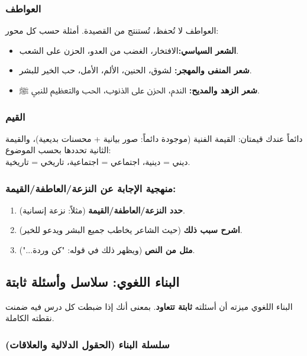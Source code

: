 \documentclass[12pt,a4paper]{book}
\begin{document}
	\subsubsection*{العواطف}
	
	العواطف لا تُحفظ، تُستنتج من القصيدة. أمثلة حسب كل محور:
		\begin{itemize}
			\item \textbf{الشعر السياسي:}الافتخار، الغضب من العدو، الحزن على الشعب.
			\item \textbf{شعر المنفى والمهجر:} لشوق، الحنين، الألم، الأمل، حب الخير للبشر.
			\item \textbf{شعر الزهد والمديح:} الندم، الحزن على الذنوب، الحب والتعظيم للنبي ﷺ. 
		\end{itemize}
	
	\subsubsection*{القيم}
	
	دائماً عندك قيمتان: القيمة الفنية (موجودة دائماً: صور بيانية + محسنات بديعية)، والقيمة الثانية تحددها بحسب الموضوع: \\ ديني = دينية، اجتماعي = اجتماعية، تاريخي = تاريخية.
	
	\subsubsection*{منهجية الإجابة عن النزعة/العاطفة/القيمة:}
	\begin{enumerate}
		\item \textbf{حدد النزعة/العاطفة/القيمة} (مثلاً: نزعة إنسانية).
		\item \textbf{اشرح سبب ذلك} (حيث الشاعر يخاطب جميع البشر ويدعو للخير).
		\item \textbf{مثل من النص} (ويظهر ذلك في قوله: "كن وردة...").
	\end{enumerate}
	
	\subsection{البناء اللغوي: سلاسل وأسئلة ثابتة}
	
	البناء اللغوي ميزته أن أسئلته \textbf{ثابتة تتعاود}. بمعنى أنك إذا ضبطت كل درس فيه ضمنت نقطته الكاملة.
	
	\subsubsection*{سلسلة البناء (الحقول الدلالية والعلاقات)}
	
\end{document}
